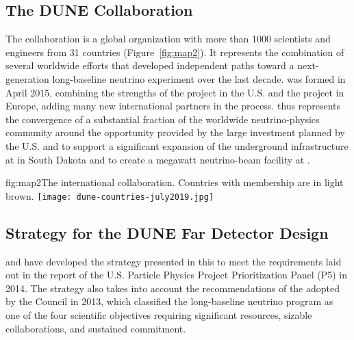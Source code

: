 \subsection{The DUNE Collaboration}

The  collaboration is a global organization with more than \num{1000} scientists and engineers from \num{31} countries (Figure~\ref{fig:map2}). It represents the combination of several worldwide efforts that developed independent paths toward a next-generation long-baseline neutrino experiment over the last decade.  was formed in April 2015, combining the strengths of the  project in the U.S. and the  project in Europe, adding many new international partners in the process.  thus represents the convergence of a substantial fraction of the worldwide neutrino-physics community around the opportunity provided by the large investment planned by the U.S.  and  to support a significant expansion of the underground infrastructure at  in South Dakota and to create a megawatt neutrino-beam facility at . 

\begin{dunefigure}{fig:map2}{The international 
collaboration. Countries with  membership are in light brown.}
\texttt{[image: dune-countries-july2019.jpg]}  
\end{dunefigure} %

\subsection{Strategy for the DUNE Far Detector Design}

 and  have developed the strategy presented in this  to meet the requirements laid 
out in the report of the U.S. Particle Physics Project Prioritization Panel (P5) in 2014. The strategy also takes into account the recommendations of the  adopted by the  Council in 2013, which classified the long-baseline neutrino program as one of the four scientific objectives requiring significant resources, sizable collaborations, and sustained commitment.

